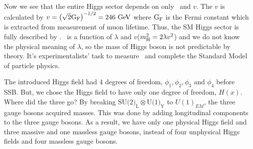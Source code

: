 Now we see that the entire Higgs sector depends on only \mHi\ and $v$.
The $v$ is calculated by $v = \left( \sqrt{2} \mathrm{G_{\mathrm{F}}} \right)^{-1/2} = 246~\mathrm{Ge\kern -0.1em V}$  
where $\mathrm{G_{\mathrm{F}}}$ is the Fermi constant which is extracted from measurement 
of muon lifetime. 
Thus, the SM Higgs sector is fully described by \mHi. 
\mHi\ is a function of $\lambda$ and $v$($m_{\mathrm{H}}^2 = 2 \lambda v^2$)
and we do not know the physical meaning of $\lambda$, so 
the mass of Higgs boson is not predictable by theory.
It's experimentalists' task to measure \mHi\ and 
complete the Standard Model of particle physics.

The introduced Higgs field had 4 degrees of freedom, $\phi_1, \phi_2, \phi_3$ 
and $\phi_4$ before SSB. But, we chose the Higgs field to have only one degree 
of freedom, $H(x)$.  Where did the three go? 
By breaking $\textrm{SU(2)}_\textrm{L} \otimes \textrm{U(1)}_\textrm{Y}$ to $U(1)_{EM}$, 
the three gauge bosons acquired masses. This was done by adding longitudinal components 
to the three gauge bosons. As a result, we have only one physical Higgs field and 
three massive and one massless gauge bosons, instead of four unphysical 
Higgs fields and four massless gauge bosons.

